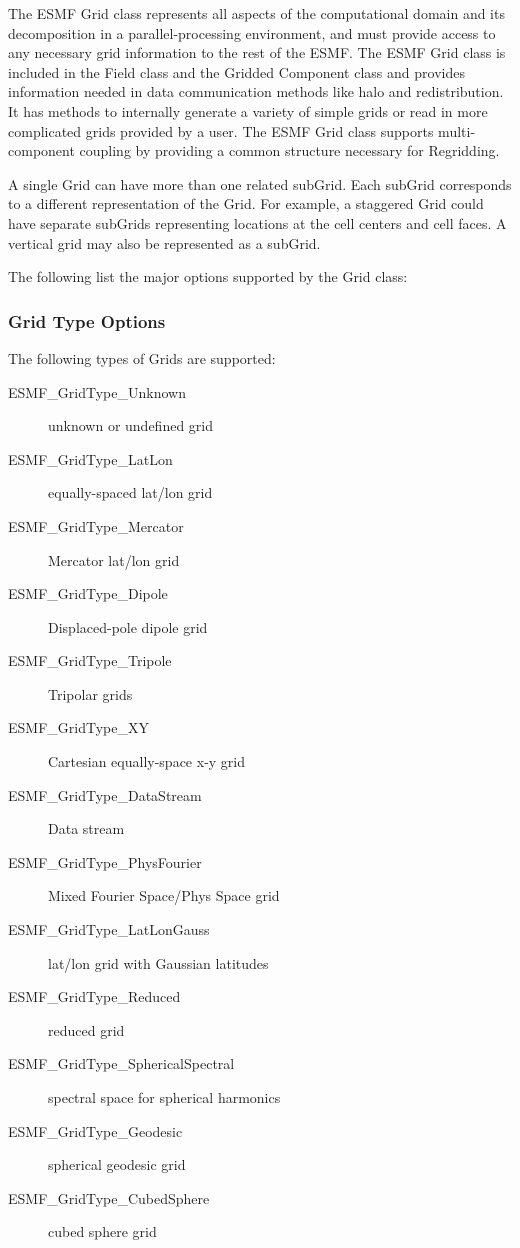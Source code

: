 %


The ESMF Grid class represents all aspects of the computational domain and its
decomposition in a parallel-processing environment, and must provide access to
any necessary grid information to the rest of the ESMF.  The ESMF Grid class
is included in the Field class and the Gridded Component class
and provides information needed in data communication methods like halo and
redistribution.  It has methods to internally generate a variety of
simple grids or read in more complicated grids provided by a user.  The
ESMF Grid class supports multi-component coupling by providing a common
structure necessary for Regridding.

A single Grid can have more than one related subGrid.  Each subGrid corresponds
to a different representation of the Grid.  For example, a staggered Grid could
have separate subGrids representing locations at the cell centers and cell 
faces.  A vertical grid may also be represented as a subGrid.

The following list the major options supported by the Grid class:
\subsubsection{Grid Type Options}
The following types of Grids are supported:
\begin{description}
   \item[ESMF\_GridType\_Unknown] unknown or undefined grid
   \item[ESMF\_GridType\_LatLon] equally-spaced lat/lon grid
   \item[ESMF\_GridType\_Mercator] Mercator lat/lon grid
   \item[ESMF\_GridType\_Dipole] Displaced-pole dipole grid
   \item[ESMF\_GridType\_Tripole] Tripolar grids
   \item[ESMF\_GridType\_XY] Cartesian equally-space x-y grid
   \item[ESMF\_GridType\_DataStream] Data stream
   \item[ESMF\_GridType\_PhysFourier] Mixed Fourier Space/Phys Space grid
   \item[ESMF\_GridType\_LatLonGauss] lat/lon grid with Gaussian latitudes
   \item[ESMF\_GridType\_Reduced] reduced grid
   \item[ESMF\_GridType\_SphericalSpectral] spectral space for spherical harmonics
   \item[ESMF\_GridType\_Geodesic] spherical geodesic grid
   \item[ESMF\_GridType\_CubedSphere] cubed sphere grid
\end{description}

